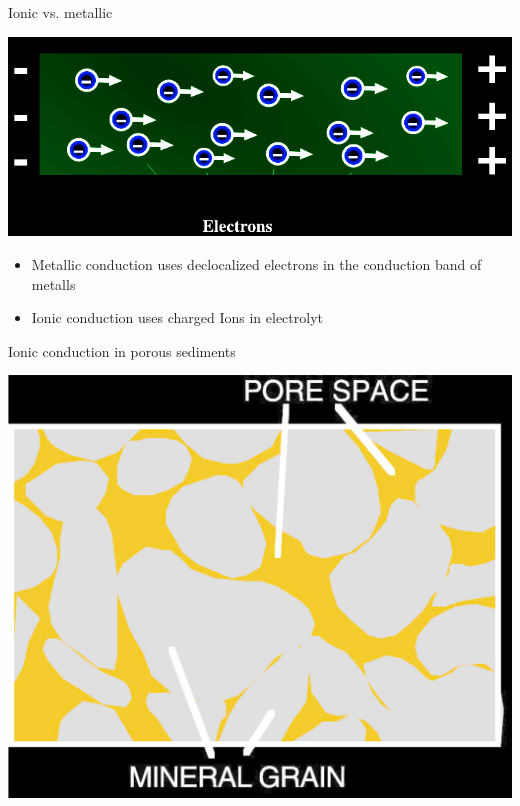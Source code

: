 \begin{frame}
  \begin{PointSix}{Ionic vs. metallic}
    \begin{center}
      \includegraphics[width=0.90\linewidth]{Figures/Resistivity/MetallicCondution.png}
    \end{center}
    \small
    \begin{itemize}
      \item \alert{Metallic conduction} uses declocalized electrons in the conduction band of metalls
      \item \alert{Ionic conduction} uses charged Ions in electrolyt 
    \end{itemize}
    \end{PointSix}
\end{frame}
\begin{frame}
  \begin{PointSix}{Ionic conduction in porous sediments}
    \begin{center}
      \includegraphics[width=0.90\linewidth]{Figures/Resistivity/ProusMedia.png}
    \end{center}
    \end{PointSix}
\end{frame}

